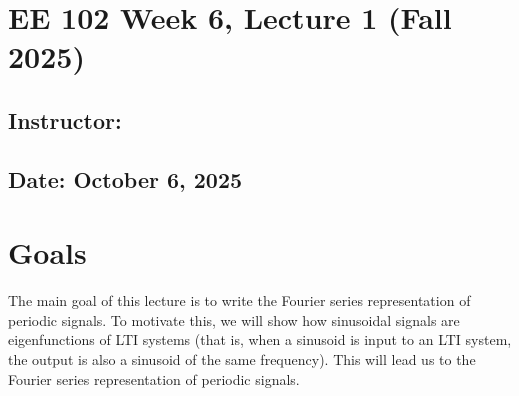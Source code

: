 \documentclass{ee102_notes}
\renewcommand{\releasedate}{October 6, 2025}
\begin{document}
\section*{EE 102 Week 6, Lecture 1 (Fall 2025)}
\subsection*{Instructor: \instructor}
\subsection*{Date: \releasedate}

\section{Goals}
The main goal of this lecture is to write the Fourier series representation of periodic signals. To motivate this, we will show how sinusoidal signals are eigenfunctions of LTI systems (that is, when a sinusoid is input to an LTI system, the output is also a sinusoid of the same frequency). This will lead us to the Fourier series representation of periodic signals.
\end{document}
